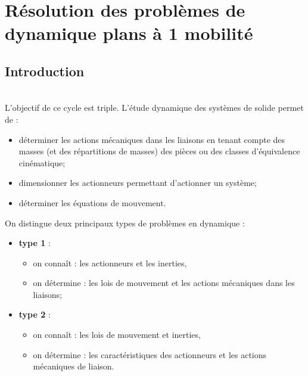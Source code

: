 \setchapterpreamble[u]{\margintoc}

\chapter{Résolution des problèmes de dynamique plans à 1 mobilité}




\def\xxnumchapitre{Chapitre 1 \vspace{.2cm}}
\def\xxchapitre{\hspace{.12cm} }


\section{Introduction}
\begin{obj} ~\\
L'objectif de ce cycle est triple. L'étude dynamique des systèmes de solide permet de :
\begin{itemize}
\item déterminer les actions mécaniques dans les liaisons en tenant compte des masses (et des répartitions de masses) des pièces ou des classes d'équivalence cinématique;
\item dimensionner les actionneurs permettant d'actionner un système; 
\item déterminer les équations de mouvement.
\end{itemize}
\end{obj}



On distingue deux principaux types de problèmes en dynamique : 
\begin{itemize}
\item \textbf{type 1} :
\begin{itemize}
\item on connaît : les actionneurs et les inerties,
\item on détermine : les lois de mouvement et les actions mécaniques dans les liaisons;
\end{itemize} 
\item \textbf{type 2} :
\begin{itemize}
\item on connaît : les lois de mouvement et inerties,
\item on détermine : les caractéristiques des actionneurs et les actions mécaniques de liaison.
\end{itemize}
\end{itemize}




